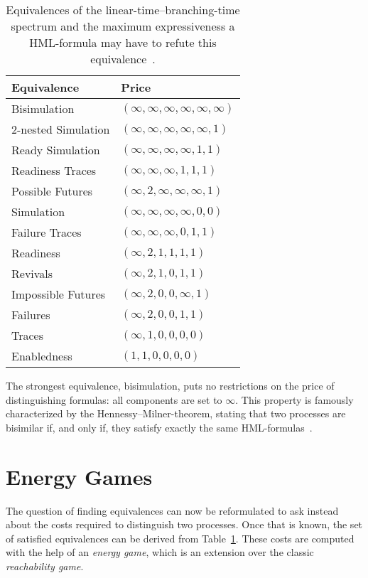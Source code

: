 \begin{table}[htpb]
    \centering
    \caption{Equivalences of the linear-time--branching-time spectrum and the
        maximum expressiveness a HML-formula may have to refute this
        equivalence~\cite{bisping2023process}.}%
    \label{tab:spectrum}
    \begin{tabular}{l l}
        \toprule
        Equivalence &Price \\
        \midrule
        Bisimulation &$(\infty, \infty, \infty, \infty, \infty, \infty)$ \\
        2-nested Simulation &$(\infty, \infty, \infty, \infty, \infty, 1)$ \\
        Ready Simulation &$(\infty, \infty, \infty, \infty, 1, 1)$ \\
        Readiness Traces &$(\infty, \infty, \infty, 1, 1, 1)$ \\
        Possible Futures &$(\infty, 2, \infty, \infty, \infty, 1)$ \\
        Simulation &$(\infty, \infty, \infty, \infty, 0, 0)$ \\
        Failure Traces &$(\infty, \infty, \infty, 0, 1, 1)$ \\
        Readiness &$(\infty, 2, 1, 1, 1, 1)$ \\
        Revivals &$(\infty, 2, 1, 0, 1, 1)$ \\
        Impossible Futures &$(\infty, 2, 0, 0, \infty, 1)$ \\
        Failures &$(\infty, 2, 0, 0, 1, 1)$ \\
        Traces &$(\infty, 1, 0, 0, 0, 0)$ \\
        Enabledness &$(1, 1, 0, 0, 0, 0)$ \\
        \bottomrule
    \end{tabular}
\end{table}

The strongest equivalence, bisimulation, puts no restrictions on the price of
distinguishing formulas: all components are set to $\infty$.
This property is famously characterized by the Hennessy--Milner-theorem,
stating that two processes are bisimilar if, and only if,
they satisfy exactly the same HML-formulas~\cite{reactive_systems}.


\section{Energy Games}\label{sec:energy_games}

The question of finding equivalences can now be reformulated to ask instead
about the costs required to distinguish two processes.
Once that is known, the set of satisfied equivalences can be derived from
Table~\ref{tab:spectrum}.
These costs are computed with the help of an \emph{energy game},
which is an extension over the classic \emph{reachability game}.

